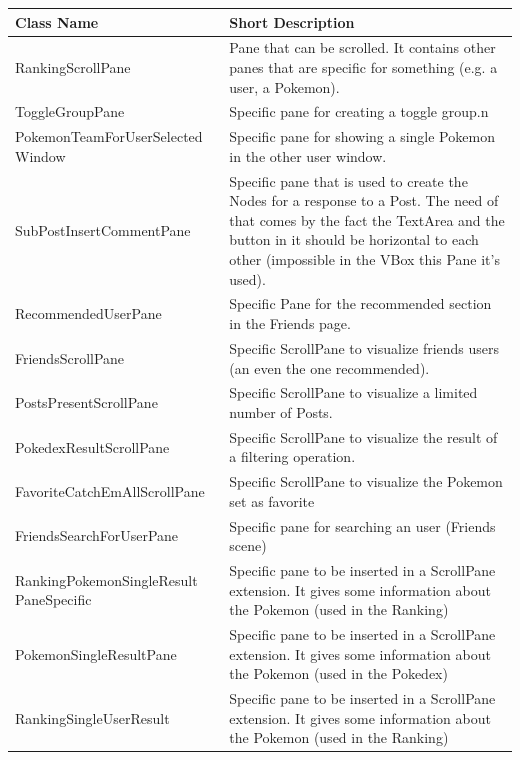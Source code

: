 \begin{center}
	\begin{longtable}{| m{14em} | m{19em} |} 
		\hline
		\textbf{Class Name} & \textbf{Short Description} \\ [0.5ex] 
		\hline
		RankingScrollPane & Pane that can be scrolled. It contains other panes that are specific for something (e.g. a user, a Pokemon).\\ 
		\hline
		ToggleGroupPane & Specific pane for creating a toggle group.n\\ 
		\hline
		PokemonTeamForUserSelected Window & Specific pane for showing a single Pokemon in the other user window.\\ 
		\hline
		SubPostInsertCommentPane & Specific pane that is used to create the Nodes for a response to a Post. The need of that comes by the fact the TextArea and the button in it should be horizontal to each other (impossible in the VBox this Pane it’s used).\\ 
		\hline
		RecommendedUserPane & Specific Pane for the recommended section in the Friends page.\\ 
		\hline
		FriendsScrollPane & Specific ScrollPane to visualize friends users (an even the one recommended).\\ 
		\hline
		PostsPresentScrollPane & Specific ScrollPane to visualize a limited number of Posts.\\ 
		\hline
		PokedexResultScrollPane & Specific ScrollPane to visualize the result of a filtering operation.\\ 
		\hline
		FavoriteCatchEmAllScrollPane & Specific ScrollPane to visualize the Pokemon set as favorite\\ 
		\hline
		FriendsSearchForUserPane & Specific pane for searching an user (Friends scene)\\ 
		\hline
		RankingPokemonSingleResult PaneSpecific & Specific pane to be inserted in a ScrollPane extension. It gives some information about the Pokemon (used in the Ranking)\\ 
		\hline
		PokemonSingleResultPane & Specific pane to be inserted in a ScrollPane extension. It gives some information about the Pokemon (used in the Pokedex)\\
		\hline
		RankingSingleUserResult & Specific pane to be inserted in a ScrollPane extension. It gives some information about the Pokemon (used in the Ranking)\\
		\hline
	\end{longtable}
\end{center}

